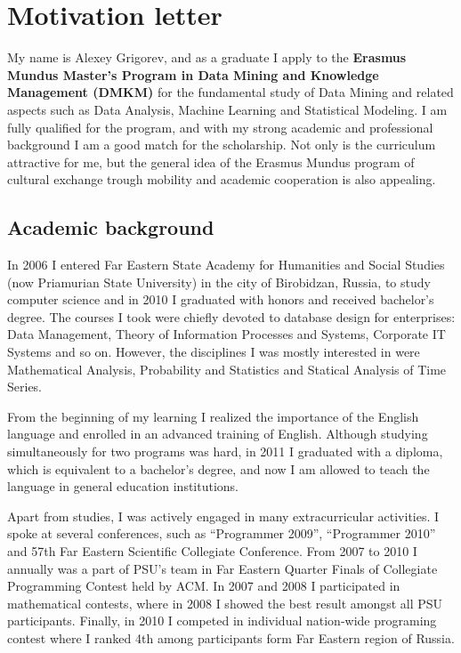 \documentclass[a4paper,12pt]{article}
\begin{document}
\section*{Motivation letter}

My name is Alexey Grigorev, and as a graduate I apply to the \textbf{Erasmus Mundus Master's Program in Data Mining and Knowledge Management (DMKM)} for the fundamental study of Data Mining and related aspects such as Data Analysis, Machine Learning and Statistical Modeling. I am fully qualified for the program, and with my strong academic and professional background I am a good match for the scholarship. Not only is the curriculum attractive for me, but the general idea of the Erasmus Mundus program of cultural exchange trough mobility and academic cooperation is also appealing.

\subsection*{Academic background}

In 2006 I entered Far Eastern State Academy for Humanities and Social Studies (now Priamurian State University) in the city of Birobidzan, Russia, to study computer science and in 2010 I graduated with honors and received bachelor's degree. The courses I took were chiefly devoted to database design for enterprises: Data Management, Theory of Information Processes and Systems, Corporate IT Systems and so on. However, the disciplines I was mostly interested in were Mathematical Analysis, Probability and Statistics and Statical Analysis of Time Series.

From the beginning of my learning I realized the importance of the English language and enrolled in an advanced training of English. Although studying simultaneously for two programs was hard, in 2011 I graduated with a diploma, which is equivalent to a bachelor's degree, and now I am allowed to teach the language in general education institutions.

Apart from studies, I was actively engaged in many extracurricular activities. I spoke at several conferences, such as ``Programmer 2009'', ``Programmer 2010'' and 57th Far Eastern Scientific Collegiate Conference. From 2007 to 2010 I annually was a part of PSU's team in Far Eastern Quarter Finals of Collegiate Programming Contest held by ACM. In 2007 and 2008 I participated in mathematical contests, where in 2008 I showed the best result amongst all PSU participants. Finally, in 2010 I competed in individual nation-wide programing contest where I ranked 4th among participants form Far Eastern region of Russia.
\end{document}

